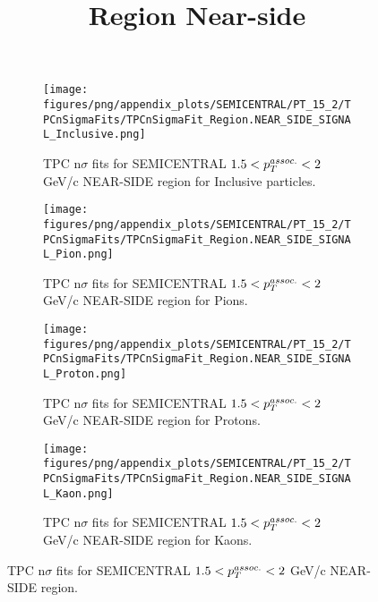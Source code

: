             \begin{figure}[H]
                \title{Region Near-side}
                \begin{subfigure}[b]{0.5\textwidth}
                    \centering
                    \texttt{[image: figures/png/appendix\_plots/SEMICENTRAL/PT\_15\_2/TPCnSigmaFits/TPCnSigmaFit\_Region.NEAR\_SIDE\_SIGNAL\_Inclusive.png]}
                    \caption{TPC n$\sigma$ fits for SEMICENTRAL $1.5 < \pTassoc < 2$ GeV/c NEAR-SIDE region for Inclusive particles.}
                    \label{fig:appendix_SEMICENTRAL_$1.5 < \pTassoc < 2$ GeV/c_NEAR_SIDE_SIGNAL_Inclusive}
                \end{subfigure}
                \begin{subfigure}[b]{0.5\textwidth}
                    \centering
                    \texttt{[image: figures/png/appendix\_plots/SEMICENTRAL/PT\_15\_2/TPCnSigmaFits/TPCnSigmaFit\_Region.NEAR\_SIDE\_SIGNAL\_Pion.png]}
                    \caption{TPC n$\sigma$ fits for SEMICENTRAL $1.5 < \pTassoc < 2$ GeV/c NEAR-SIDE region for Pions.}
                    \label{fig:appendix_SEMICENTRAL_$1.5 < \pTassoc < 2$ GeV/c_NEAR_SIDE_SIGNAL_Pion}
                \end{subfigure}
                \begin{subfigure}[b]{0.5\textwidth}
                    \centering
                    \texttt{[image: figures/png/appendix\_plots/SEMICENTRAL/PT\_15\_2/TPCnSigmaFits/TPCnSigmaFit\_Region.NEAR\_SIDE\_SIGNAL\_Proton.png]}
                    \caption{TPC n$\sigma$ fits for SEMICENTRAL $1.5 < \pTassoc < 2$ GeV/c NEAR-SIDE region for Protons.}
                    \label{fig:appendix_SEMICENTRAL_$1.5 < \pTassoc < 2$ GeV/c_NEAR_SIDE_SIGNAL_Proton}
                \end{subfigure}
                \begin{subfigure}[b]{0.5\textwidth}
                    \centering
                    \texttt{[image: figures/png/appendix\_plots/SEMICENTRAL/PT\_15\_2/TPCnSigmaFits/TPCnSigmaFit\_Region.NEAR\_SIDE\_SIGNAL\_Kaon.png]}
                    \caption{TPC n$\sigma$ fits for SEMICENTRAL $1.5 < \pTassoc < 2$ GeV/c NEAR-SIDE region for Kaons.}
                    \label{fig:appendix_SEMICENTRAL_$1.5 < \pTassoc < 2$ GeV/c_NEAR_SIDE_SIGNAL_Kaon}
                \end{subfigure}
                \caption{TPC n$\sigma$ fits for SEMICENTRAL $1.5 < \pTassoc < 2$ GeV/c NEAR-SIDE region.}
                \label{fig:appendix_SEMICENTRAL_$1.5 < \pTassoc < 2$ GeV/c_NEAR_SIDE_SIGNAL}
            \end{figure}
